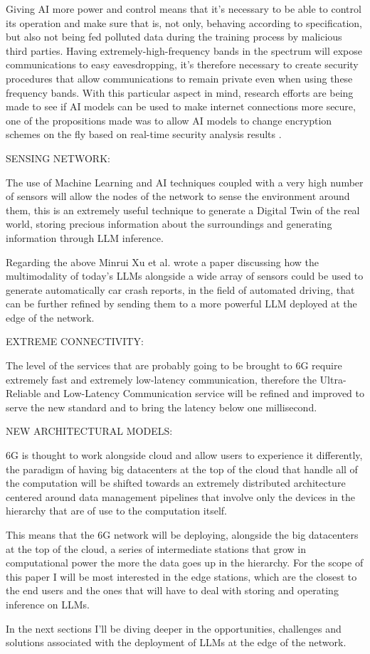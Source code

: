 Giving AI more power and control means that it's necessary to be able to
control its operation and make sure that is, not only, behaving according to specification, but also
not being fed polluted data during the training process by malicious third parties. Having extremely-high-frequency bands in the spectrum will expose communications to easy
eavesdropping, it's therefore necessary to create security procedures that allow communications to
remain private even when using these frequency bands. With this particular aspect in mind, research
efforts are being made to see if AI models can be used to make internet connections more secure,
one of the propositions made was to allow AI models to change encryption schemes on the fly based on
real-time security analysis results \cite{6ainets}.

\bigskip
\noindent
SENSING NETWORK:
\label{ssec:sensing-network}

The use of Machine Learning and AI techniques coupled with a very high number of sensors will allow
the nodes of the network to sense the environment around them, this is an extremely useful technique to generate a Digital Twin of the real world, storing precious information about the surroundings and generating information through LLM inference.

Regarding the above Minrui Xu et al. \cite{pga} wrote a paper discussing how the multimodality of
today’s LLMs alongside a wide array of sensors could be used to generate automatically car crash
reports, in the field of automated driving, that can be further refined by sending them to a more
powerful LLM deployed at the edge of the network.

\bigskip
\noindent
EXTREME CONNECTIVITY:
\label{ssec:extreme-connectivity}

The level of the services that are probably going to be brought to 6G require extremely fast and extremely
low-latency communication, therefore the Ultra-Reliable and Low-Latency Communication service will
be refined and improved to serve the new standard and to bring the latency below one millisecond.

\bigskip
\noindent
NEW ARCHITECTURAL MODELS:
\label{ssec:architectural-models}

6G is thought to work alongside cloud and allow users to experience it differently, the paradigm of having
big datacenters at the top of the cloud that handle all of the computation will be shifted towards an extremely distributed architecture centered around data management pipelines that involve only the devices in the hierarchy that are of use to the computation itself.

This means that the 6G network will be deploying, alongside the big datacenters at the top of the cloud, a series of intermediate stations that grow in computational power the more the data goes up in the hierarchy. For the scope of this paper I will be most interested in the edge stations, which are the closest to the end users and the ones that will have to deal with storing and operating inference on LLMs.

\medskip
In the next sections I’ll be diving deeper in the opportunities, challenges and solutions associated with the deployment of LLMs at the edge of the network.
